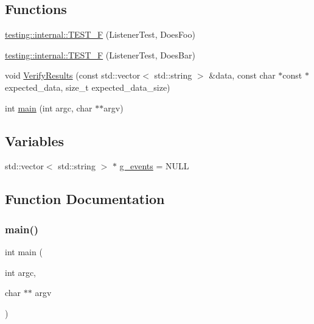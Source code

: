 \subsection*{Functions}
\begin{DoxyCompactItemize}
\item 
\mbox{\hyperlink{namespacetesting_1_1internal_a7e113e9c70d45d89fe1703e58ff083b9}{testing\+::internal\+::\+T\+E\+S\+T\+\_\+F}} (Listener\+Test, Does\+Foo)
\item 
\mbox{\hyperlink{namespacetesting_1_1internal_a02cef32090020d164460dd3d9f8e2852}{testing\+::internal\+::\+T\+E\+S\+T\+\_\+F}} (Listener\+Test, Does\+Bar)
\item 
void \mbox{\hyperlink{_obj__test_2lib_2googletest-release-1_88_81_2googletest_2test_2googletest-listener-test_8cc_ab9d583cd17d35925ad3d12f864d57fe9}{Verify\+Results}} (const std\+::vector$<$ std\+::string $>$ \&data, const char $\ast$const $\ast$expected\+\_\+data, size\+\_\+t expected\+\_\+data\+\_\+size)
\item 
int \mbox{\hyperlink{_obj__test_2lib_2googletest-release-1_88_81_2googletest_2test_2googletest-listener-test_8cc_a3c04138a5bfe5d72780bb7e82a18e627}{main}} (int argc, char $\ast$$\ast$argv)
\end{DoxyCompactItemize}
\subsection*{Variables}
\begin{DoxyCompactItemize}
\item 
std\+::vector$<$ std\+::string $>$ $\ast$ \mbox{\hyperlink{_obj__test_2lib_2googletest-release-1_88_81_2googletest_2test_2googletest-listener-test_8cc_a32a264046f3603db11e6fcdaea5fb094}{g\+\_\+events}} = N\+U\+LL
\end{DoxyCompactItemize}


\subsection{Function Documentation}
\mbox{\label{_obj__test_2lib_2googletest-release-1_88_81_2googletest_2test_2googletest-listener-test_8cc_a3c04138a5bfe5d72780bb7e82a18e627}} 
\subsubsection{\texorpdfstring{main()}{main()}}
{\footnotesize\ttfamily int main (\begin{DoxyParamCaption}\item[{int}]{argc,  }\item[{char $\ast$$\ast$}]{argv }\end{DoxyParamCaption})}

